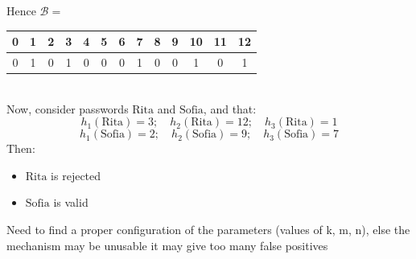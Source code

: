 \documentclass{article}
\begin{document}
                        Hence \( \mathcal{B} = \)
                        \vspace{10pt}
                        \begin{tabular}{|*{13}{c|}}
                            \hline
                            0 & 1 & 2 & 3 & 4 & 5 & 6 & 7 & 8 & 9 & 10 & 11 & 12 \\
                            \hline
                            0 & 1 & 0 & 1 & 0 & 0 & 0 & 1 & 0 & 0 & 1 & 0 & 1 \\
                            \hline
                        \end{tabular}\\
                        \vspace{10pt}
                            Now, consider passwords \( \text{Rita} \) and \( \text{Sofia} \), and that:
                            \[
                            h_1(\text{Rita}) = 3; \quad h_2(\text{Rita}) = 12; \quad h_3(\text{Rita}) = 1
                            \]
                            \[
                            h_1(\text{Sofia}) = 2; \quad h_2(\text{Sofia}) = 9; \quad h_3(\text{Sofia}) = 7
                            \]
                            Then:
                            \begin{itemize}
                                \item \( \text{Rita} \) is rejected
                                \item \( \text{Sofia} \) is valid
                            \end{itemize}

                            \vspace*{10pt}
                            Need to find a proper configuration of the parameters (values of k, m, n), else the mechanism may be unusable
                            it may give too many false positives
\end{document}
